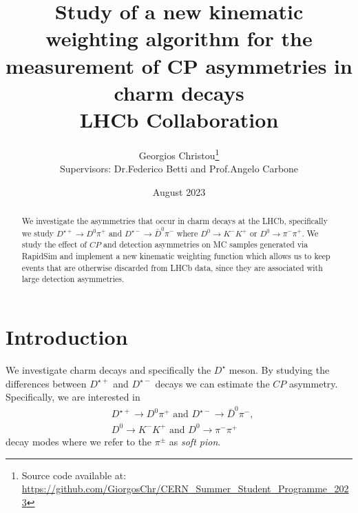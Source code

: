 \documentclass{article}
\title{\textbf{
        Study of a new kinematic weighting algorithm for the measurement of CP asymmetries in charm decays}
        \\
        LHCb Collaboration
}
\author{
        Georgios Christou\thanks{Source code available at: \url{https://github.com/GiorgosChr/CERN_Summer_Student_Programme_2023}}
        \\
        Supervisors: Dr.\@ Federico Betti and Prof.\@ Angelo Carbone
}
\date{
        August 2023
}
\begin{document}
        \begin{figure}[t]
                \centering
                \hypersetup{hidelinks} %
                \hspace{1cm}
        \end{figure}

        \maketitle
        \thispagestyle{empty}

        \begin{abstract}
                We investigate the asymmetries that occur in charm decays at the LHCb, specifically we study $D^{\star+}\to D^0\pi^+$ and $D^{\star-}\to \bar{D}^0\pi^-$ where $D^0\to K^-K^+$ or $D^0\to \pi^-\pi^+$.
                We study the effect of $CP$ and detection asymmetries on MC samples generated via RapidSim and implement a new kinematic weighting function which allows us to keep events that are otherwise discarded from LHCb data, since they are associated with large detection asymmetries.
        \end{abstract}

        
        \pagebreak


        \section{Introduction}
        We investigate charm decays and specifically the $D^\star$ meson.
        By studying the differences between $D^{\star +}$ and $D^{\star -}$ decays we can estimate the $CP$ asymmetry.
        Specifically, we are interested in
        \begin{eqnarray}
                &D^{\star+}\to D^0\pi^+ \text{ and } D^{\star-}\to \bar{D}^0\pi^-, \nonumber\\
                &D^0 \to K^-K^+ \text{ and } D^0 \to \pi^-\pi^+
        \end{eqnarray}
        decay modes where we refer to the $\pi^\pm$ as \textit{soft pion}.
\end{document}
